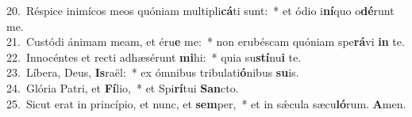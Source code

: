 {20.~}Réspice inimícos meos quóniam multipli\textbf{cá}ti sunt:~* et ódio i\textbf{ní}quo o\textbf{dé}runt me.\\
{21.~}Custódi ánimam meam, et éru\textbf{e} me:~* non erubéscam quóniam spe\textbf{rá}vi \textbf{in} te.\\
{22.~}Innocéntes et recti adhæsérunt \textbf{mi}hi:~* quia su\textbf{stí}nu\textbf{i} te.\\
{23.~}Líbera, Deus, \textbf{Is}raël:~* ex ómnibus tribulati\textbf{ó}nibus \textbf{su}is.\\
{24.~}Glória Patri, et \textbf{Fí}lio,~* et Spi\textbf{rí}tui \textbf{San}cto.\\
{25.~}Sicut erat in princípio, et nunc, et \textbf{sem}per,~* et in sǽcula sæcu\textbf{ló}rum. \textbf{A}men.\\
